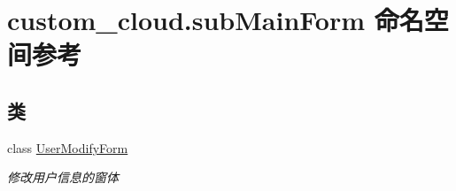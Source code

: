 \hypertarget{namespacecustom__cloud_1_1sub_main_form}{}\section{custom\+\_\+cloud.\+sub\+Main\+Form 命名空间参考}
\label{namespacecustom__cloud_1_1sub_main_form}
\subsection*{类}
\begin{DoxyCompactItemize}
\item 
class \hyperlink{classcustom__cloud_1_1sub_main_form_1_1_user_modify_form}{User\+Modify\+Form}
\begin{DoxyCompactList}\small\item\em 修改用户信息的窗体 \end{DoxyCompactList}\end{DoxyCompactItemize}
